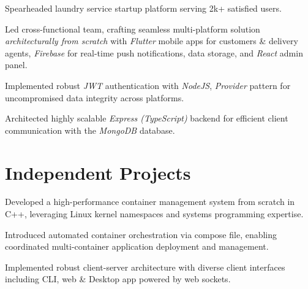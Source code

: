 \documentclass[]{deedy-resume-openfont}
\begin{document}
\begin{minipage}[t]{0.66\textwidth}

\begin{tightemize}
\item Spearheaded laundry service startup platform serving 2k+ satisfied users.
\item Led cross-functional team, crafting seamless multi-platform solution \textit{architecturally from scratch} with \textit{Flutter} mobile apps for customers \& delivery agents, \textit{Firebase} for real-time push notifications, data storage, and \textit{React} admin panel.
\item Implemented robust \textit{JWT} authentication with \textit{NodeJS}, \textit{Provider} pattern for uncompromised data integrity across platforms.
\item Architected highly scalable \textit{Express (TypeScript)} backend for efficient client communication with the \textit{MongoDB} database.
\end{tightemize}

\sectionsep


\section{Independent Projects}

\begin{tightemize}
\item Developed a high-performance container management system from scratch in C++, leveraging Linux kernel namespaces and systems programming expertise.
\item Introduced automated container orchestration via compose file, enabling coordinated multi-container application deployment and management.
\item Implemented robust client-server architecture with diverse client interfaces including CLI, web \& Desktop app powered by web sockets.
\end{tightemize}
\sectionsep


\end{minipage}
\end{document}
